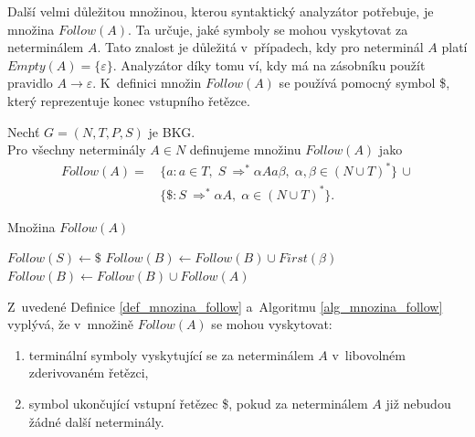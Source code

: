 Další velmi důležitou množinou, kterou syntaktický analyzátor potřebuje, je množina $Follow(A)$.
Ta určuje, jaké symboly se mohou vyskytovat za neterminálem $A$.
Tato znalost je důležitá v~případech, kdy pro neterminál $A$ platí $Empty(A) = \{\varepsilon\}$.
Analyzátor díky tomu ví, kdy má na zásobníku použít pravidlo $A \rightarrow \varepsilon$.
K~definici množin $Follow(A)$ se používá pomocný symbol \$, který reprezentuje konec vstupního řetězce.
\begin{definition}\label{def_mnozina_follow}
    Nechť $G = (N, T, P, S)$ je BKG.\\
    Pro všechny neterminály $A \in N$ definujeme množinu $Follow(A)$ jako
    \begin{align*}
        Follow(A) = \,&\{a: a \in T,\; S~\Rightarrow^* \alpha Aa\beta,\; \alpha, \beta \in (N \cup T)^*\}\, \cup \\
                      &\{\$: S~\Rightarrow^* \alpha A,\; \alpha \in (N \cup T)^*\}.
    \end{align*}
\end{definition}
\begin{algorithm}[h!]
    \caption{Množina $Follow(A)$}
    \label{alg_mnozina_follow}
    \begin{algorithmic}[1]
        \NewLine
        \State $Follow(S) \gets \$$
                \If{$\beta \neq \varepsilon$}
                    \State $Follow(B) \gets Follow(B) \cup First(\beta)$
                \EndIf
                    \State $Follow(B) \gets Follow(B) \cup Follow(A)$
                \EndIf
            \EndIf
        \EndWhile 
    \end{algorithmic}
\end{algorithm}

Z~uvedené Definice \ref{def_mnozina_follow} a~Algoritmu \ref{alg_mnozina_follow} vyplývá, že v~množině $Follow(A)$ se mohou vyskytovat:
\begin{enumerate}
    \item terminální symboly vyskytující se za neterminálem $A$ v~libovolném zderivovaném řetězci,
    \item symbol ukončující vstupní řetězec \$, pokud za neterminálem $A$ již nebudou žádné další neterminály. 
\end{enumerate}

